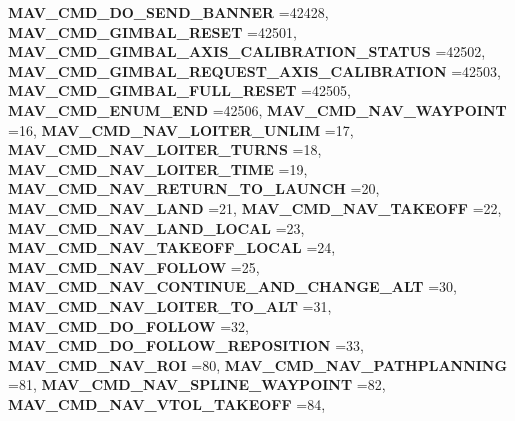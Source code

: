 \begin{DoxyCompactItemize}
\newline
\textbf{ M\+A\+V\+\_\+\+C\+M\+D\+\_\+\+D\+O\+\_\+\+S\+E\+N\+D\+\_\+\+B\+A\+N\+N\+ER} =42428, 
\textbf{ M\+A\+V\+\_\+\+C\+M\+D\+\_\+\+G\+I\+M\+B\+A\+L\+\_\+\+R\+E\+S\+ET} =42501, 
\textbf{ M\+A\+V\+\_\+\+C\+M\+D\+\_\+\+G\+I\+M\+B\+A\+L\+\_\+\+A\+X\+I\+S\+\_\+\+C\+A\+L\+I\+B\+R\+A\+T\+I\+O\+N\+\_\+\+S\+T\+A\+T\+US} =42502, 
\textbf{ M\+A\+V\+\_\+\+C\+M\+D\+\_\+\+G\+I\+M\+B\+A\+L\+\_\+\+R\+E\+Q\+U\+E\+S\+T\+\_\+\+A\+X\+I\+S\+\_\+\+C\+A\+L\+I\+B\+R\+A\+T\+I\+ON} =42503, 
\newline
\textbf{ M\+A\+V\+\_\+\+C\+M\+D\+\_\+\+G\+I\+M\+B\+A\+L\+\_\+\+F\+U\+L\+L\+\_\+\+R\+E\+S\+ET} =42505, 
\textbf{ M\+A\+V\+\_\+\+C\+M\+D\+\_\+\+E\+N\+U\+M\+\_\+\+E\+ND} =42506, 
\textbf{ M\+A\+V\+\_\+\+C\+M\+D\+\_\+\+N\+A\+V\+\_\+\+W\+A\+Y\+P\+O\+I\+NT} =16, 
\textbf{ M\+A\+V\+\_\+\+C\+M\+D\+\_\+\+N\+A\+V\+\_\+\+L\+O\+I\+T\+E\+R\+\_\+\+U\+N\+L\+IM} =17, 
\newline
\textbf{ M\+A\+V\+\_\+\+C\+M\+D\+\_\+\+N\+A\+V\+\_\+\+L\+O\+I\+T\+E\+R\+\_\+\+T\+U\+R\+NS} =18, 
\textbf{ M\+A\+V\+\_\+\+C\+M\+D\+\_\+\+N\+A\+V\+\_\+\+L\+O\+I\+T\+E\+R\+\_\+\+T\+I\+ME} =19, 
\textbf{ M\+A\+V\+\_\+\+C\+M\+D\+\_\+\+N\+A\+V\+\_\+\+R\+E\+T\+U\+R\+N\+\_\+\+T\+O\+\_\+\+L\+A\+U\+N\+CH} =20, 
\textbf{ M\+A\+V\+\_\+\+C\+M\+D\+\_\+\+N\+A\+V\+\_\+\+L\+A\+ND} =21, 
\newline
\textbf{ M\+A\+V\+\_\+\+C\+M\+D\+\_\+\+N\+A\+V\+\_\+\+T\+A\+K\+E\+O\+FF} =22, 
\textbf{ M\+A\+V\+\_\+\+C\+M\+D\+\_\+\+N\+A\+V\+\_\+\+L\+A\+N\+D\+\_\+\+L\+O\+C\+AL} =23, 
\textbf{ M\+A\+V\+\_\+\+C\+M\+D\+\_\+\+N\+A\+V\+\_\+\+T\+A\+K\+E\+O\+F\+F\+\_\+\+L\+O\+C\+AL} =24, 
\textbf{ M\+A\+V\+\_\+\+C\+M\+D\+\_\+\+N\+A\+V\+\_\+\+F\+O\+L\+L\+OW} =25, 
\newline
\textbf{ M\+A\+V\+\_\+\+C\+M\+D\+\_\+\+N\+A\+V\+\_\+\+C\+O\+N\+T\+I\+N\+U\+E\+\_\+\+A\+N\+D\+\_\+\+C\+H\+A\+N\+G\+E\+\_\+\+A\+LT} =30, 
\textbf{ M\+A\+V\+\_\+\+C\+M\+D\+\_\+\+N\+A\+V\+\_\+\+L\+O\+I\+T\+E\+R\+\_\+\+T\+O\+\_\+\+A\+LT} =31, 
\textbf{ M\+A\+V\+\_\+\+C\+M\+D\+\_\+\+D\+O\+\_\+\+F\+O\+L\+L\+OW} =32, 
\textbf{ M\+A\+V\+\_\+\+C\+M\+D\+\_\+\+D\+O\+\_\+\+F\+O\+L\+L\+O\+W\+\_\+\+R\+E\+P\+O\+S\+I\+T\+I\+ON} =33, 
\newline
\textbf{ M\+A\+V\+\_\+\+C\+M\+D\+\_\+\+N\+A\+V\+\_\+\+R\+OI} =80, 
\textbf{ M\+A\+V\+\_\+\+C\+M\+D\+\_\+\+N\+A\+V\+\_\+\+P\+A\+T\+H\+P\+L\+A\+N\+N\+I\+NG} =81, 
\textbf{ M\+A\+V\+\_\+\+C\+M\+D\+\_\+\+N\+A\+V\+\_\+\+S\+P\+L\+I\+N\+E\+\_\+\+W\+A\+Y\+P\+O\+I\+NT} =82, 
\textbf{ M\+A\+V\+\_\+\+C\+M\+D\+\_\+\+N\+A\+V\+\_\+\+V\+T\+O\+L\+\_\+\+T\+A\+K\+E\+O\+FF} =84, 

\end{DoxyCompactItemize}
